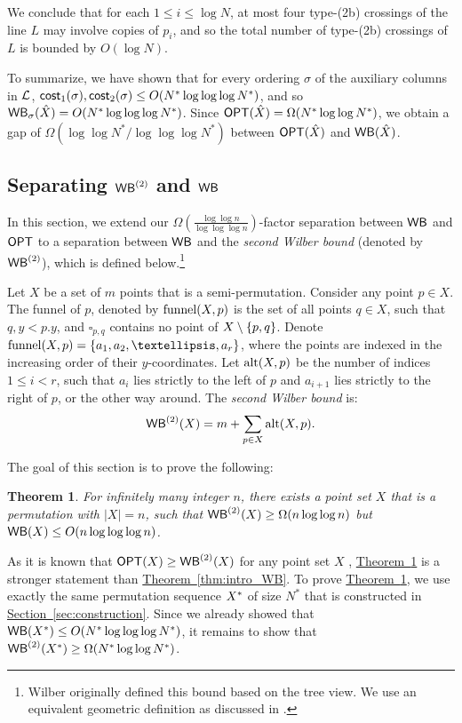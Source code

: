 \documentclass[11pt]{article}
\numberwithin{equation}{section}
\newtheorem{theorem}{Theorem}[section]
\theoremstyle{definition}
\theoremstyle{plain}
\newcommand{\expref}[2]{\hyperref[#2]{#1~\ref{#2}}}
\begin{document}
We conclude that for each $1\leq i\leq \log N$, at most four type-(2b) crossings of the line $L$ may involve copies of $p_i$, and so the total number of type-(2b) crossings of $L$ is bounded by $O(\log N)$.


To summarize, we have shown that for every ordering $\sigma$ of the auxiliary columns in ${\mathcal L}$, $\mathsf{cost}_1(\sigma),\mathsf{cost}_2(\sigma)\leq O(N^*\log\log\log N^*)$, and so $\mathsf{WB}_{\sigma}(\hat X)=O(N^*\log\log\log N^*)$. Since $\mbox{\sf OPT}(\hat X)=\Omega(N^*\log\log N^*)$, we obtain a gap of $\Omega(\log\log N^*/\log\log\log N^*)$ between $\mbox{\sf OPT}(\hat X)$ and $\mathsf{WB}(\hat X)$.

\subsection{Separating $\mathsf{WB}^{(2)}$ and $\mathsf{WB}$}
\label{subsec: separating two wilbers}

In this section, we extend our $\Omega(\frac{\log\log n}{\log\log\log n})$-factor
separation between $\mathsf{WB}$ and $\mbox{\sf OPT}$ to a separation between $\mathsf{WB}$
and the \emph{second Wilber bound} (denoted by $\mathsf{WB}^{(2)}$), which is defined below.\footnote{Wilber originally defined this bound based on the tree view. We use an equivalent geometric definition as discussed in \cite{DHIKP09,in_pursuit}.}


Let $X$ be a set of $m$ points that is a semi-permutation. Consider any point $p\in X$. The funnel of $p$, denoted by $\mathrm{funnel}(X,p)$ is the set of all points $q\in X$, such that $q,y<p.y$, and $\square_{p,q}$ contains no point of $X\setminus\left\{ p,q \right\}$. 
Denote $\funnel(X,p)=\set{a_1,a_2,\ldots,a_r}$, where the points are indexed in the increasing order of their $y$-coordinates. Let $\mathrm{alt}(X,p)$ be the number of indices $1\leq i<r$, such that $a_i$ lies strictly to the left of $p$ and $a_{i+1}$ lies strictly to the right of $p$, or the other way around. The
\emph{second Wilber bound } is:
\[
\mathsf{WB}^{(2)}(X)=m+\sum_{p\in X}\mathrm{alt}(X,p).
\]


The goal of this section is to prove the following:
\begin{theorem}
\label{thm:sep WBtwo}For infinitely many integer $n$, there exists a point set $X$ that is a permutation with $|X|=n$, such that $\mathsf{WB}^{(2)}(X)\ge\Omega(n\log\log n)$ but $\mathsf{WB}(X)\le O(n\log\log\log n)$.
\end{theorem}

As it is known that $\mbox{\sf OPT}(X)\ge\mathsf{WB}^{(2)}(X)$ for any point set $X$ \cite{wilber},
\expref{Theorem}{thm:sep WBtwo} is a stronger statement than \expref{Theorem}{thm:intro_WB}.
To prove \expref{Theorem}{thm:sep WBtwo}, we use exactly the same permutation
sequence $X^{*}$ of size $N^{*}$ that is constructed in \expref{Section}{sec:construction}. Since we already showed that  $\mathsf{WB}(X^{*})\le O(N^{*}\log\log\log N^{*})$, 
it remains to show that $\mathsf{WB}^{(2)}(X^{*})\ge\Omega(N^{*}\log\log N^{*})$.
\end{document}
